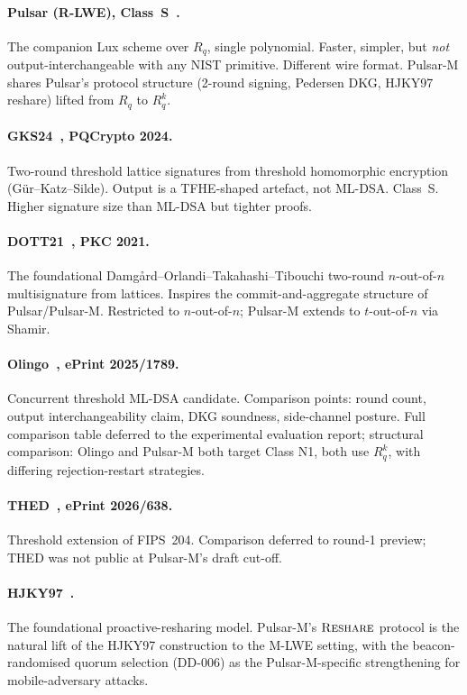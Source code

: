 \documentclass[11pt,a4paper]{article}
\theoremstyle{definition}
\theoremstyle{remark}
\newcommand{\Rq}{R_q}
\newcommand{\Reshare}{\textsc{Reshare}}
\begin{document}
\paragraph{Pulsar (R-LWE), Class~S~\cite{boschini2024corona}.}
The companion Lux scheme over $\Rq$, single polynomial. Faster,
simpler, but \emph{not} output-interchangeable with any NIST primitive.
Different wire format. Pulsar-M shares Pulsar's protocol structure
(2-round signing, Pedersen DKG, HJKY97 reshare) lifted from $\Rq$ to
$\Rq^k$.

\paragraph{GKS24~\cite{gks24}, PQCrypto 2024.}
Two-round threshold lattice signatures from threshold homomorphic
encryption (G\"ur--Katz--Silde). Output is a TFHE-shaped artefact, not
ML-DSA. Class~S. Higher signature size than ML-DSA but tighter
proofs.

\paragraph{DOTT21~\cite{dott21}, PKC 2021.}
The foundational Damg\aa rd--Orlandi--Takahashi--Tibouchi two-round
$n$-out-of-$n$ multisignature from lattices. Inspires the
commit-and-aggregate structure of Pulsar/Pulsar-M. Restricted to
$n$-out-of-$n$; Pulsar-M extends to $t$-out-of-$n$ via Shamir.

\paragraph{Olingo~\cite{olingo2025}, ePrint 2025/1789.}
Concurrent threshold ML-DSA candidate. Comparison points: round
count, output interchangeability claim, DKG soundness, side-channel
posture. Full comparison table deferred to the experimental
evaluation report; structural comparison: Olingo and Pulsar-M both
target Class N1, both use $\Rq^k$, with differing rejection-restart
strategies.

\paragraph{THED~\cite{thed2026}, ePrint 2026/638.}
Threshold extension of FIPS~204. Comparison deferred to round-1
preview; THED was not public at Pulsar-M's draft cut-off.

\paragraph{HJKY97~\cite{hjky97}.}
The foundational proactive-resharing model. Pulsar-M's $\Reshare$
protocol is the natural lift of the HJKY97 construction to the M-LWE
setting, with the beacon-randomised quorum selection (DD-006) as the
Pulsar-M-specific strengthening for mobile-adversary attacks.
\end{document}

